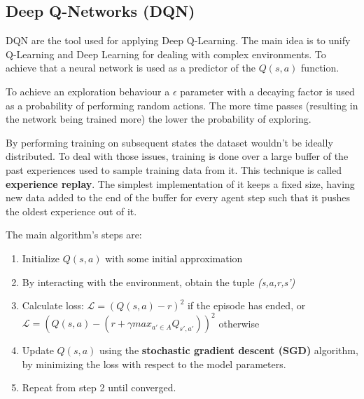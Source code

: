 \documentclass[12pt]{article}
\begin{document}
\subsection{Deep Q-Networks (DQN)}

DQN \cite{atari} are the tool used for applying Deep Q-Learning. The main idea is to unify Q-Learning and Deep Learning for dealing with complex environments. 
To achieve that a neural network is used as a predictor of the $Q(s, a)$ function.

To achieve an exploration behaviour a $\epsilon$ parameter with a decaying factor is used as a probability of performing random actions. The more time passes (resulting in the network being trained more) the lower the probability of exploring.

By performing training on subsequent states the dataset wouldn't be ideally distributed. To deal with those issues, training is done over a large buffer of the past experiences used to sample training data from it. This technique is called \textbf{experience replay}. The simplest implementation of it keeps a fixed size, having new data added to the end of the buffer for every agent step such that it pushes the oldest experience out of it. 

The main algorithm's steps are:
\begin{enumerate}
    \item Initialize $Q(s,a)$ with some initial approximation
    \item By interacting with the environment, obtain the tuple \textit{(s,a,r,s')}
    \item Calculate loss: $\mathcal{L} =(Q(s,a)-r)^2$ if the episode has ended, or $\mathcal{L} =(Q(s,a)-(r+\gamma max_{a' \in A} Q_{s',a'}))^2$ otherwise
    \item Update $Q(s,a)$ using the \textbf{stochastic gradient descent (SGD)} algorithm, by minimizing the loss with respect to the model parameters.
    \item Repeat from step 2 until converged.
\end{enumerate}
\end{document}
